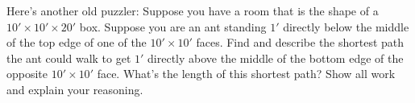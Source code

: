 \documentclass[noauthor,nooutcomes,hints,handout]{ximera}
\begin{document}
\begin{question}
  Here's another old puzzler: Suppose you have a room that is the
  shape of a $10'\times 10' \times 20'$ box. Suppose you are an ant
  standing $1'$ directly below the middle of the top edge of one of
  the $10'\times 10'$ faces.  Find and describe the shortest path the
  ant could walk to get $1'$ directly above the middle of the bottom
  edge of the opposite $10'\times10'$ face.  What's the length of this
  shortest path? Show all work and explain your reasoning.

\end{question}
\end{document}
